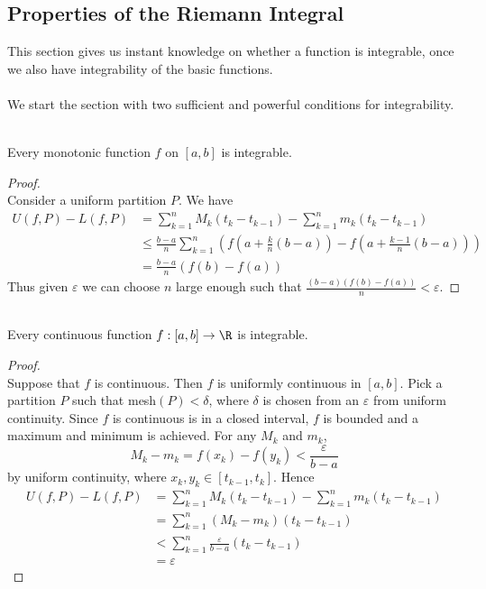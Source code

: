 \documentclass[a4paper]{article}
\begin{document}
\subsection{Properties of the Riemann Integral}
This section gives us instant knowledge on whether a function is integrable, once we also have integrability of the basic functions. \\~\\
We start the section with two sufficient and powerful conditions for integrability. 
\begin{thm}{}{}\\ Every monotonic function $f$ on $[a,b]$ is integrable. 
\begin{proof}\\ Consider a uniform partition $P$. We have 
\begin{align*}
U(f,P)-L(f,P)&=\sum_{k=1}^nM_k(t_k-t_{k-1})-\sum_{k=1}^nm_k(t_k-t_{k-1})\\
&\leq\frac{b-a}{n}\sum_{k=1}^n\left(f\left(a+\frac{k}{n}(b-a)\right)-f\left(a+\frac{k-1}{n}(b-a)\right)\right)\\
&=\frac{b-a}{n}(f(b)-f(a))
\end{align*}
Thus given $\varepsilon$ we can choose $n$ large enough such that $\frac{(b-a)(f(b)-f(a))}{n}<\varepsilon$. 
\end{proof}
\end{thm}

\begin{thm}{}{}\\ Every continuous function $f:[a,b]\to\R$ is integrable. 
\begin{proof}\\ Suppose that $f$ is continuous. Then $f$ is uniformly continuous in $[a,b]$. Pick a partition $P$ such that mesh$(P)<\delta$, where $\delta$ is chosen from an $\varepsilon$ from uniform continuity. Since $f$ is continuous is in a closed interval, $f$ is bounded and a maximum and minimum is achieved. For any $M_k$ and $m_k$, $$M_k-m_k=f(x_k)-f(y_k)<\frac{\varepsilon}{b-a}$$ by uniform continuity, where $x_k,y_k\in[t_{k-1},t_k]$. Hence 
\begin{align*}
U(f,P)-L(f,P)&=\sum_{k=1}^nM_k(t_k-t_{k-1})-\sum_{k=1}^nm_k(t_k-t_{k-1})\\
&=\sum_{k=1}^n(M_k-m_k)(t_k-t_{k-1})\\
&<\sum_{k=1}^n\frac{\varepsilon}{b-a}(t_k-t_{k-1})\\
&=\varepsilon
\end{align*}
\end{proof}
\end{thm}
\end{document}
